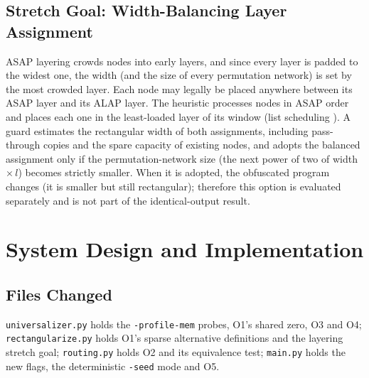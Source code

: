 \documentclass[12pt,a4paper,oneside]{report}
\newcommand{\code}[1]{\texttt{#1}}
\begin{document}
\subsection{Stretch Goal: Width-Balancing Layer Assignment}
ASAP layering crowds nodes into early layers, and since every layer is padded to the widest one,
the width (and the size of every permutation network) is set by the most crowded layer. Each node
may legally be placed anywhere between its ASAP layer and its ALAP layer. The heuristic processes
nodes in ASAP order and places each one in the least-loaded layer of its window (list scheduling
\cite{graham}). A guard estimates the rectangular width of both assignments, including
pass-through copies and the spare capacity of existing nodes, and adopts the balanced assignment
only if the permutation-network size (the next power of two of width $\times\, l$) becomes strictly
smaller. When it is adopted, the obfuscated program changes (it is smaller but still rectangular);
therefore this option is evaluated separately and is not part of the identical-output result.

\section{System Design and Implementation}
\subsection{Files Changed}
\code{universalizer.py} holds the \code{-profile-mem} probes, O1's shared zero, O3 and O4;
\code{rectangularize.py} holds O1's sparse alternative definitions and the layering stretch goal;
\code{routing.py} holds O2 and its equivalence test; \code{main.py} holds the new flags, the
deterministic \code{-seed} mode and O5.
\end{document}
